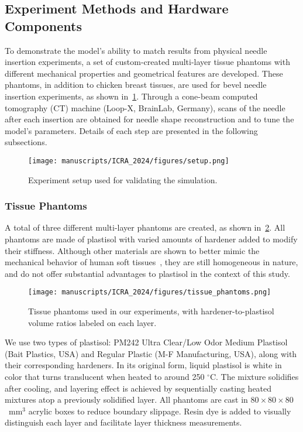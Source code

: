\subsection{Experiment Methods and Hardware Components}
\label{sec:chap-4-experiment-methods}

To demonstrate the model's ability to match results from physical needle insertion experiments, a set of custom-created multi-layer tissue phantoms with different mechanical properties and geometrical features are developed. These phantoms, in addition to chicken breast tissues, are used for bevel needle insertion experiments, as shown in~\cref{fig:chap-4-robot}. Through a cone-beam computed tomography (CT) machine (Loop-X, BrainLab, Germany), scans of the needle after each insertion are obtained for needle shape reconstruction and to tune the model's parameters. Details of each step are presented in the following subsections.
\begin{figure}[ht]
  \centering
  \texttt{[image: manuscripts/ICRA\_2024/figures/setup.png]}
  \caption{Experiment setup used for validating the simulation.}
  \label{fig:chap-4-robot}
\end{figure}

\subsubsection{Tissue Phantoms}
\label{sec:chap-4-developed-phantoms}

A total of three different multi-layer phantoms are created, as shown in~\cref{fig:chap-4-phantoms}. All phantoms are made of plastisol with varied amounts of hardener added to modify their stiffness. Although other materials are shown to better mimic the mechanical behavior of human soft tissues~\parencite{tejo-oteroSoftTissueMimickingUsingHydrogels2022}, they are still homogeneous in nature, and do not offer substantial advantages to plastisol in the context of this study. 

\begin{figure}[t]
  \centering
  \texttt{[image: manuscripts/ICRA\_2024/figures/tissue\_phantoms.png]}
  \caption{Tissue phantoms used in our experiments, with hardener-to-plastisol volume ratios labeled on each layer.}
  \label{fig:chap-4-phantoms}
\end{figure}

We use two types of plastisol: PM242 Ultra Clear/Low Odor Medium Plastisol (Bait Plastics, USA) and Regular Plastic (M-F Manufacturing, USA), along with their corresponding hardeners. In its original form, liquid plastisol is white in color that turns translucent when heated to around 250 $^{\circ}$C. The mixture solidifies after cooling, and layering effect is achieved by sequentially casting heated mixtures atop a previously solidified layer. All phantoms are cast in $80\times80\times80$~mm$^3$ acrylic boxes to reduce boundary slippage. Resin dye is added to visually distinguish each layer and facilitate layer thickness measurements.

